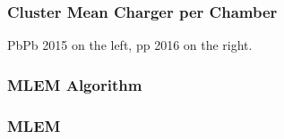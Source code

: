\documentclass{beamer}
\begin{document}
\begin{frame}
  \frametitle{Cluster Mean Charger per Chamber}

PbPb 2015 on the left, pp 2016 on the right.
\end{frame}

\begin{frame}
  \frametitle{MLEM Algorithm}
\end{frame}

\begin{frame}
  \frametitle{MLEM }

\end{frame}
\end{document}
